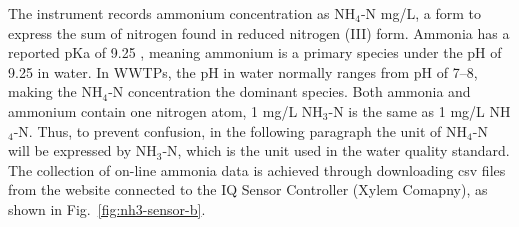 The instrument records ammonium concentration as NH$_{4}$-N mg/L, a form to express the sum of nitrogen found in reduced nitrogen (III) form. Ammonia has a reported pKa of 9.25 \citep{nationalcenterforbiotechnologyinformationPubChemCompoundSummary2022}, meaning ammonium is a primary species under the pH of 9.25 in water. In WWTPs, the pH in water normally ranges from pH of 7--8, making the NH$_{4}$-N concentration the dominant species. Both ammonia and ammonium contain one nitrogen atom, 1 mg/L NH$_{3}$-N is the same as 1 mg/L NH$_{4}$-N. Thus, to prevent confusion, in the following paragraph the unit of NH$_{4}$-N will be expressed by NH$_{3}$-N, which is the unit used in the water quality standard. The collection of on-line ammonia data is achieved through downloading csv files from the website connected to the IQ Sensor Controller (Xylem Comapny), as shown in Fig.~\ref{fig:nh3-sensor-b}. 

